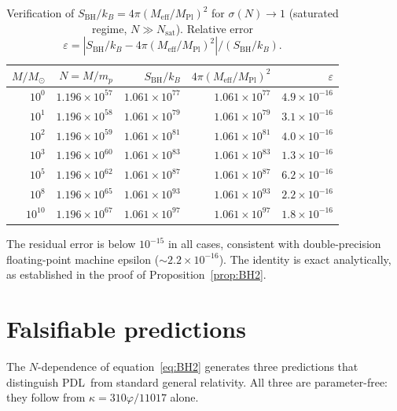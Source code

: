 \documentclass[11pt,a4paper]{article}
\theoremstyle{definition}
\newcommand{\PDL}{\textnormal{PDL}}
\newcommand{\vp}{\varphi}
\newcommand{\kap}{\kappa}
\newcommand{\sig}{\sigma}
\newcommand{\SBH}{S_{\mathrm{BH}}}
\newcommand{\Meff}{M_{\mathrm{eff}}}
\newcommand{\MPl}{M_{\mathrm{Pl}}}
\begin{document}
\begin{table}[ht]
\centering
\caption{Verification of $\SBH/k_B = 4\pi(\Meff/\MPl)^2$ for $\sig(N) \to 1$
(saturated regime, $N \gg N_\mathrm{sat}$). Relative error $\varepsilon =
|S_\mathrm{BH}/k_B - 4\pi(\Meff/\MPl)^2| / (S_\mathrm{BH}/k_B)$.}
\label{tab:BH2}
\medskip
\begin{tabular}{rrrrr}
\toprule
$M/M_\odot$ & $N = M/m_p$ & $S_\mathrm{BH}/k_B$ & $4\pi(\Meff/\MPl)^2$ & $\varepsilon$ \\
\midrule
$10^0$ & $1.196\times10^{57}$ & $1.061\times10^{77}$ & $1.061\times10^{77}$ & $4.9\times10^{-16}$ \\
$10^1$ & $1.196\times10^{58}$ & $1.061\times10^{79}$ & $1.061\times10^{79}$ & $3.1\times10^{-16}$ \\
$10^2$ & $1.196\times10^{59}$ & $1.061\times10^{81}$ & $1.061\times10^{81}$ & $4.0\times10^{-16}$ \\
$10^3$ & $1.196\times10^{60}$ & $1.061\times10^{83}$ & $1.061\times10^{83}$ & $1.3\times10^{-16}$ \\
$10^5$ & $1.196\times10^{62}$ & $1.061\times10^{87}$ & $1.061\times10^{87}$ & $6.2\times10^{-16}$ \\
$10^8$ & $1.196\times10^{65}$ & $1.061\times10^{93}$ & $1.061\times10^{93}$ & $2.2\times10^{-16}$ \\
$10^{10}$ & $1.196\times10^{67}$ & $1.061\times10^{97}$ & $1.061\times10^{97}$ & $1.8\times10^{-16}$ \\
\bottomrule
\end{tabular}
\end{table}

The residual error is below $10^{-15}$ in all cases, consistent with
double-precision floating-point machine epsilon ($\sim 2.2\times10^{-16}$).
The identity is exact analytically, as established in the proof of
Proposition~\ref{prop:BH2}.

\section{Falsifiable predictions}
\label{sec:predictions}

The $N$-dependence of equation~\eqref{eq:BH2} generates three predictions
that distinguish \PDL\ from standard general relativity. All three are
parameter-free: they follow from $\kap = 310\vp/11017$ alone.
\end{document}
